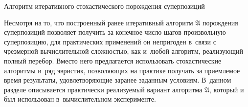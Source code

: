 \documentclass[12pt,a4paper]{article}
\makeatletter
\renewcommand{\section}{\@startsection {section}{1}
  \z@{2.7ex \@plus 1ex}{1.0ex}%
  {\normalfont}}
\makeatother
\begin{document}

\section{Алгоритм итеративного стохастического порождения суперпозиций}

Несмотря на то, что построенный ранее итеративный алгоритм $\mathfrak{A}$ порождения
суперпозиций позволяет получить за конечное число шагов произвольную
суперпозицию, для практических применений он непригоден в~связи с чрезмерной
вычислительной сложностью, как и~любой алгоритм, реализующий полный перебор.
Вместо него предлагается использовать стохастические алгоритмы и~ряд эвристик,
позволяющих на практике получать за приемлемое время результаты,
удовлетворяющие заранее заданным условиям. В~данном разделе описывается
практически реализуемый вариант алгоритма $\mathfrak{A}$, который и был использован
в~вычислительном эксперименте.
\end{document}
